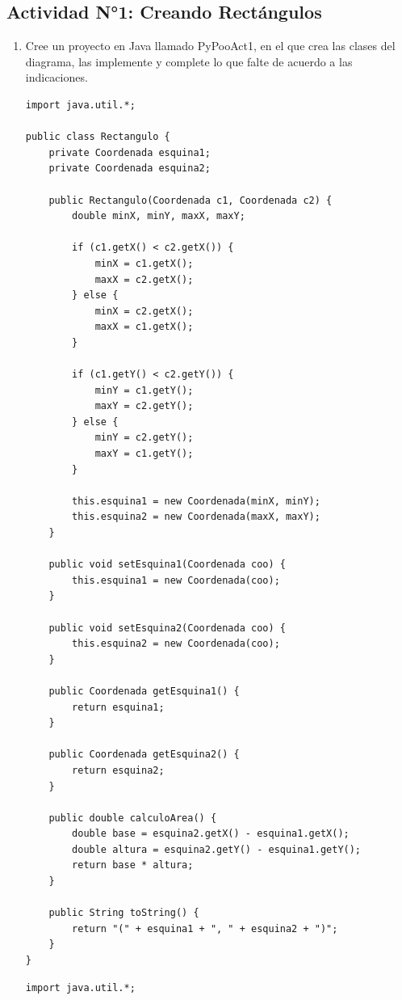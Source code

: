 \documentclass[12pt]{article}
\begin{document}
\subsection{Actividad N°1: Creando Rectángulos}
\begin{enumerate}
  \item Cree un proyecto en Java llamado PyPooAct1, en el que crea las clases del diagrama, las
    implemente y complete lo que falte de acuerdo a las indicaciones.



\begin{verbatim}
import java.util.*;

public class Rectangulo {
    private Coordenada esquina1;
    private Coordenada esquina2;

    public Rectangulo(Coordenada c1, Coordenada c2) {
        double minX, minY, maxX, maxY;

        if (c1.getX() < c2.getX()) {
            minX = c1.getX();
            maxX = c2.getX();
        } else {
            minX = c2.getX();
            maxX = c1.getX();
        }

        if (c1.getY() < c2.getY()) {
            minY = c1.getY();
            maxY = c2.getY();
        } else {
            minY = c2.getY();
            maxY = c1.getY();
        }
        
        this.esquina1 = new Coordenada(minX, minY);
        this.esquina2 = new Coordenada(maxX, maxY);
    }

    public void setEsquina1(Coordenada coo) {
        this.esquina1 = new Coordenada(coo);
    }

    public void setEsquina2(Coordenada coo) {
        this.esquina2 = new Coordenada(coo);
    }

    public Coordenada getEsquina1() {
        return esquina1;
    }

    public Coordenada getEsquina2() {
        return esquina2;
    }

    public double calculoArea() {
        double base = esquina2.getX() - esquina1.getX();
        double altura = esquina2.getY() - esquina1.getY();
        return base * altura;
    }

    public String toString() {
        return "(" + esquina1 + ", " + esquina2 + ")";
    }
}

\end{verbatim}


\begin{verbatim}
import java.util.*;


\end{verbatim}
\end{enumerate}
\end{document}
